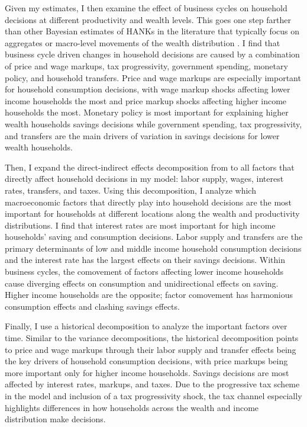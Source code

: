 Given my estimates, I then examine the effect of business cycles on household decisions at different productivity and wealth levels. This goes one step farther than other Bayesian estimates of HANKs in the literature that typically focus on aggregates \autocites{auclert2020micro}{acharya2023estimating} or macro-level movements of the wealth distribution \autocites{bayer2024shocks}. I find that business cycle driven changes in household decisions are caused by a combination of price and wage markups, tax progressivity, government spending, monetary policy, and household transfers. Price and wage markups are especially important for household consumption decisions, with wage markup shocks affecting lower income households the most and price markup shocks affecting higher income households the most. Monetary policy is most important for explaining higher wealth households savings decisions while government spending, tax progressivity, and transfers are the main drivers of variation in savings decisions for lower wealth households. 

Then, I expand the direct-indirect effects decomposition from \textcite{kaplan2018monetary} to all factors that directly affect household decisions in my model: labor supply, wages, interest rates, transfers, and taxes. Using this decomposition, I analyze which macroeconomic factors that directly play into household decisions are the most important for households at different locations along the wealth and productivity distributions. I find that interest rates are most important for high income households' saving and consumption decisions. Labor supply and transfers are the primary determinants of low and middle income household consumption decisions and the interest rate has the largest effects on their savings decisions. Within business cycles, the comovement of factors affecting lower income households cause diverging effects on consumption and unidirectional effects on saving. Higher income households are the opposite; factor comovement has harmonious consumption effects and clashing savings effects.

Finally, I use a historical decomposition to analyze the important factors over time. Similar to the variance decompositions, the historical decomposition points to price and wage markups through their labor supply and transfer effects being the key drivers of household consumption decisions, with price markups being more important only for higher income households. Savings decisions are most affected by interest rates, markups, and taxes. Due to the progressive tax scheme in the model and inclusion of a tax progressivity shock, the tax channel especially highlights differences in how households across the wealth and income distribution make decisions. 
